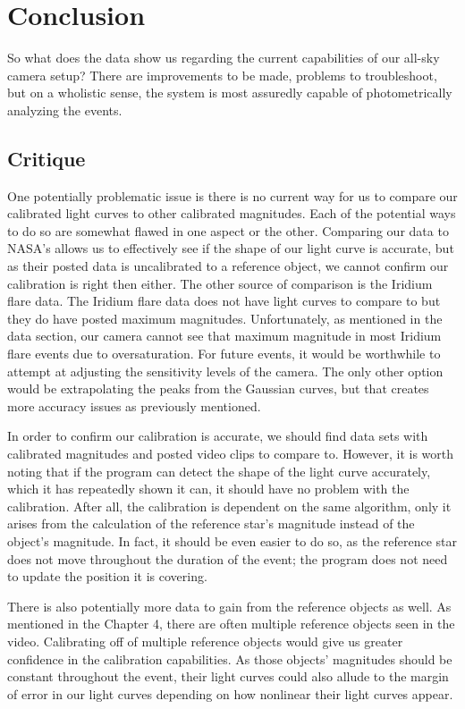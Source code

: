 \chapter{Conclusion}

So what does the data show us regarding the current capabilities of our all-sky camera setup? There are improvements to be made, problems to troubleshoot, but on a wholistic sense, the system is most assuredly capable of photometrically analyzing the events.

\section{Critique}
One potentially problematic issue is there is no current way for us to compare our calibrated light curves to other calibrated magnitudes. Each of the potential ways to do so are somewhat flawed in one aspect or the other. Comparing our data to NASA's allows us to effectively see if the shape of our light curve is accurate, but as their posted data is uncalibrated to a reference object, we cannot confirm our calibration is right then either. The other source of comparison is the Iridium flare data. The Iridium flare data does not have light curves to compare to but they do have posted maximum magnitudes. Unfortunately, as mentioned in the data section, our camera cannot see that maximum magnitude in most Iridium flare events due to oversaturation. For future events, it would be worthwhile to attempt at adjusting the sensitivity levels of the camera. The only other option would be extrapolating the peaks from the Gaussian curves, but that creates more accuracy issues as previously mentioned.

In order to confirm our calibration is accurate, we should find data sets with calibrated magnitudes and posted video clips to compare to. However, it is worth noting that if the program can detect the shape of the light curve accurately, which it has repeatedly shown it can, it should have no problem with the calibration. After all, the calibration is dependent on the same algorithm, only it arises from the calculation of the reference star's magnitude instead of the object's magnitude. In fact, it should be even easier to do so, as the reference star does not move throughout the duration of the event; the program does not need to update the position it is covering. 

There is also potentially more data to gain from the reference objects as well. As mentioned in the Chapter 4, there are often multiple reference objects seen in the video. Calibrating off of multiple reference objects would give us greater confidence in the calibration capabilities. As those objects' magnitudes should be constant throughout the event, their light curves could also allude to the margin of error in our light curves depending on how nonlinear their light curves appear.

